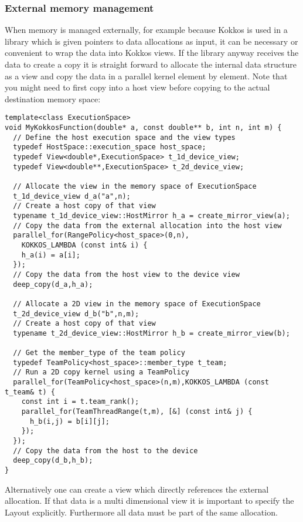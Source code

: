 \subsubsection{External memory management}

When memory is managed externally, for example because Kokkos is used
in a library which is given pointers to data allocations as input, it can be necessary 
or convenient to wrap the data into Kokkos views. If the library anyway receives the 
data to create a copy it is straight forward to allocate the internal data structure as a
view and copy the data in a parallel kernel element by element. Note that you might
need to first copy into a host view before copying to the actual destination memory 
space:

\begin{lstlisting}
template<class ExecutionSpace>
void MyKokkosFunction(double* a, const double** b, int n, int m) {
  // Define the host execution space and the view types
  typedef HostSpace::execution_space host_space;
  typedef View<double*,ExecutionSpace> t_1d_device_view;
  typedef View<double**,ExecutionSpace> t_2d_device_view;
  
  // Allocate the view in the memory space of ExecutionSpace
  t_1d_device_view d_a("a",n);
  // Create a host copy of that view
  typename t_1d_device_view::HostMirror h_a = create_mirror_view(a);
  // Copy the data from the external allocation into the host view
  parallel_for(RangePolicy<host_space>(0,n),
    KOKKOS_LAMBDA (const int& i) {
    h_a(i) = a[i];
  });
  // Copy the data from the host view to the device view
  deep_copy(d_a,h_a);
  
  // Allocate a 2D view in the memory space of ExecutionSpace
  t_2d_device_view d_b("b",n,m);
  // Create a host copy of that view
  typename t_2d_device_view::HostMirror h_b = create_mirror_view(b);
  
  // Get the member_type of the team policy
  typedef TeamPolicy<host_space>::member_type t_team;
  // Run a 2D copy kernel using a TeamPolicy
  parallel_for(TeamPolicy<host_space>(n,m),KOKKOS_LAMBDA (const t_team& t) {
    const int i = t.team_rank();
    parallel_for(TeamThreadRange(t,m), [&] (const int& j) {
      h_b(i,j) = b[i][j];
    });
  });
  // Copy the data from the host to the device
  deep_copy(d_b,h_b);
}
\end{lstlisting}

Alternatively one can create a view which directly references the external allocation.
If that data is a multi dimensional view it is important to specify the Layout explicitly.
Furthermore all data must be part of the same allocation.

